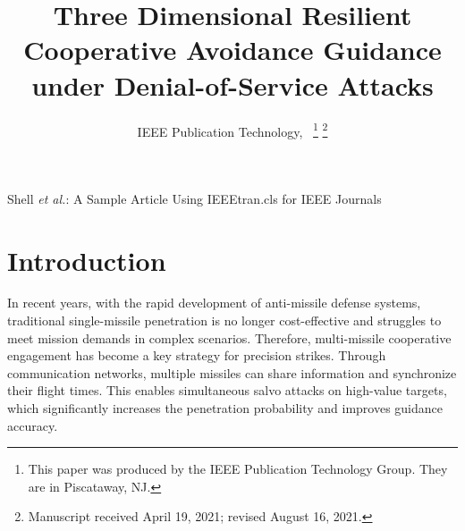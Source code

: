 \documentclass[lettersize,journal]{IEEEtran}
\begin{document}
\title{Three Dimensional Resilient Cooperative Avoidance Guidance \\ under Denial-of-Service Attacks}

\author{IEEE Publication Technology,~
\thanks{This paper was produced by the IEEE Publication Technology Group. They are in Piscataway, NJ.}%
\thanks{Manuscript received April 19, 2021; revised August 16, 2021.}}

%
{Shell \MakeLowercase{\textit{et al.}}: A Sample Article Using IEEEtran.cls for IEEE Journals}


\maketitle

\begin{abstract}

\end{abstract}

\begin{IEEEkeywords}

\end{IEEEkeywords}

\section{Introduction}
In recent years, with the rapid development of anti-missile defense systems, traditional single-missile penetration is no longer cost-effective and struggles to meet mission demands in complex scenarios. Therefore, multi-missile cooperative engagement has become a key strategy for precision strikes. Through communication networks, multiple missiles can share information and synchronize their flight times. This enables simultaneous salvo attacks on high-value targets, which significantly increases the penetration probability and improves guidance accuracy.
\end{document}
